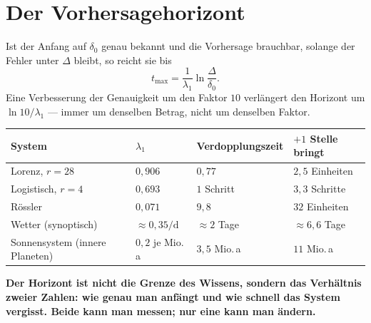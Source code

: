 \section{Der Vorhersagehorizont}

\begin{merksatz}
Ist der Anfang auf $\delta_0$ genau bekannt und die Vorhersage brauchbar, solange der Fehler unter $\Delta$ bleibt, so reicht sie bis
\[ t_{\max} = \frac1{\lambda_1}\ln\frac{\Delta}{\delta_0} . \]
Eine Verbesserung der Genauigkeit um den Faktor $10$ verlängert den Horizont um $\ln10/\lambda_1$ --- immer um denselben Betrag, nicht um denselben Faktor.

\begin{center}
{\small
\renewcommand{\arraystretch}{1.46}
\begin{tabular}{@{}P{2.9cm}P{1.5cm}P{2.0cm}P{2.3cm}@{}}
\toprule
\textbf{System} & $\lambda_1$ & \textbf{Verdopp\-lungs\-zeit} & \textbf{$+1$ Stelle bringt}\\
\midrule
Lorenz, $r = 28$ & $0{,}906$ & $0{,}77$ & $2{,}5$ Einheiten\\
Logistisch, $r = 4$ & $0{,}693$ & $1$ Schritt & $3{,}3$ Schritte\\
Rössler & $0{,}071$ & $9{,}8$ & $32$ Einheiten\\
Wetter (synoptisch) & $\approx 0{,}35/\mathrm d$ & $\approx 2$ Tage & $\approx 6{,}6$ Tage\\
Sonnensystem (innere Planeten) & $0{,}2$ je Mio.\,a & $3{,}5$ Mio.\,a & $11$ Mio.\,a\\
\bottomrule
\end{tabular}}
\end{center}

\begin{center}
\begin{minipage}{0.9\textwidth}
\textbf{Der Horizont ist nicht die Grenze des Wissens, sondern das Verhältnis zweier Zahlen: wie genau man anfängt und wie schnell das System vergisst. Beide kann man messen; nur eine kann man ändern.}
\end{minipage}
\end{center}


\end{merksatz}
